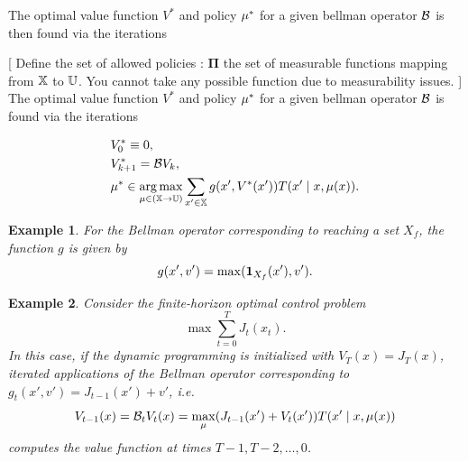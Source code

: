 \documentclass[conference]{IEEEtran}
\newtheorem{example}{Example}
\newcommand{\sofie}[1]{{\color{orange}[ #1 ]}}
\begin{document}
The optimal value function $V^*$ and policy $\mu^*$ for a given bellman operator $\mathcal{B}$ is then found via the iterations

\sofie{Define the set of allowed policies : $\mathbf \Pi$ the set of measurable functions mapping from $\mathbb{X}$ to $\mathbb{U}$.  You cannot take any possible function due to measurability issues.  }
The optimal value function $V^*$ and policy $\mu^*$ for a given bellman operator $\mathcal{B}$ is found via the iterations

\begin{subequations}
\label{eq:value_iter}
  \begin{align}
    & V^*_0 \equiv 0, \\
    & V^*_{k+1}  = \bellman V_k \label{eq:iter}, \\
    & \pol^* \in \argmax_{\pol \in (\X \rightarrow \U)} \sum_{x' \in \X}  g(x', V^*(x')) T(x' \mid x, \pol(x)).
  \end{align}
\end{subequations}

\begin{example}
  For the Bellman operator corresponding to reaching a set $X_f$, the function $g$ is given by
  \begin{equation*}
    g(x', v') = \max( \mathbf{1}_{X_f}(x'), v').
  \end{equation*}
\end{example}

\begin{example}
  Consider the finite-horizon optimal control problem 
  \begin{equation}
     \max \sum_{t=0}^T J_t(x_t).
  \end{equation} 
  In this case, if the dynamic programming is initialized with $V_T(x) = J_T(x)$, iterated applications of the Bellman operator corresponding to $g_t(x', v') = J_{t-1}(x') + v'$, i.e.
  \begin{equation*}
    V_{t-1}(x) = \mathcal{B}_t V_{t} (x) = \max_{\mu} (J_{t-1}(x') + V_{t}(x')) T(x' \mid x, \mu(x))
  \end{equation*}
  computes the value function at times $T-1, T-2, \ldots, 0$.
\end{example}
\end{document}
